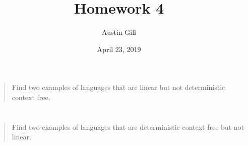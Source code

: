 \documentclass{article}
\title{Homework 4}
\author{Austin Gill}
\date{April 23, 2019}
\begin{document}
\maketitle

\section{}
\begin{quote}
    Find two examples of languages that are linear but not deterministic context free.
\end{quote}

\section{}
\begin{quote}
    Find two examples of languages that are deterministic context free but not linear.
\end{quote}
\end{document}
